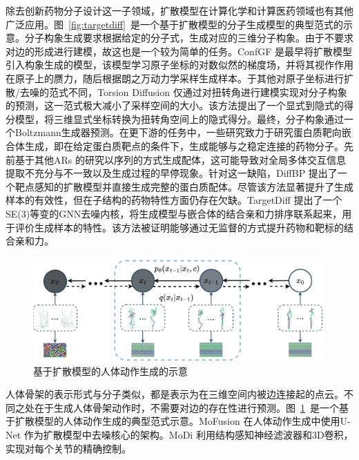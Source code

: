 除去创新药物分子设计这一子领域，扩散模型在计算化学和计算医药领域也有其他广泛应用。图~\ref{fig:targetdiff}~是一个基于扩散模型的分子生成模型的典型范式的示意。分子构象生成要求根据给定的分子式，生成对应的三维分子构象。由于不要求对边的形成进行建模，故这也是一个较为简单的任务。ConfGF \cite{confgf_shi_21}是最早将扩散模型引入构象生成的模型，该模型学习原子坐标的对数似然的梯度场，并将其视作作用在原子上的赝力，随后根据朗之万动力学采样生成样本。于其他对原子坐标进行扩散/去噪的范式不同，Torsion Diffusion \cite{tordiff_jing_22}仅通过对扭转角进行建模实现对分子构象的预测，这一范式极大减小了采样空间的大小。该方法提出了一个显式到隐式的得分模型，将三维显式坐标转换为扭转角空间上的隐式得分。最终，分子构象通过一个Boltzmann生成器预测。在更下游的任务中，一些研究致力于研究蛋白质靶向嵌合体生成，即在给定蛋白质靶点的条件下，生成能够与之稳定连接的药物分子。先前基于其他ARs \cite{graphbp_liu_22, arligand_luo_21, pocket2mol_peng_22}的研究以序列的方式生成配体，这可能导致对全局多体交互信息提取不充分与不一致以及生成过程的早停现象。针对这一缺陷，DiffBP \cite{diffbp_lin_22} 提出了一个靶点感知的扩散模型并直接生成完整的蛋白质配体。尽管该方法显著提升了生成样本的有效性，但在子结构的药物特性方面仍存在欠缺。TargetDiff \cite{targetdiff_guan_23}提出了一个SE(3)等变的GNN去噪内核，将生成模型与嵌合体的结合亲和力排序联系起来，用于评价生成样本的特性。该方法被证明能够通过无监督的方式提升药物和靶标的结合亲和力。

\begin{figure}[h]
  \centering
  \includegraphics[width=\linewidth]{figures/modiff.png}
  \caption{基于扩散模型的人体动作生成的示意 \cite{modiff_zhao_23}}
  \label{fig:modiff}
\end{figure}

人体骨架的表示形式与分子类似，都是表示为在三维空间内被边连接起的点云。不同之处在于生成人体骨架动作时，不需要对边的存在性进行预测。图~\ref{fig:modiff}~是一个基于扩散模型的人体动作生成的典型范式示意。MoFusion \cite{mofusion_dabral_22}在人体动作生成中使用U-Net \cite{unet_ronneberger_15}作为扩散模型中去噪核心的架构。MoDi \cite{modi_raab_22} 利用结构感知神经滤波器和3D卷积，实现对每个关节的精确控制。


